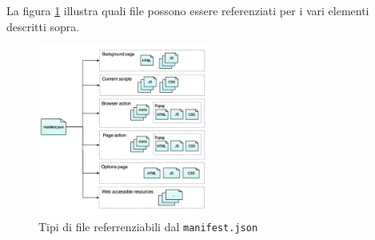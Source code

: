 \documentclass{sapthesis}
\newcommand{\code}[1]{\texttt{#1}}
\newcommand{\manifest}{\code{manifest.json}}
\begin{document}
        La figura \ref{fig:manifest-content} illustra quali file possono essere referenziati per i vari elementi descritti sopra.

        \begin{figure}[ht]
            \centering                                                  
            \includegraphics[width=0.5\textwidth]{webextension-manifest-content}
            \caption{Tipi di file referrenziabili dal \manifest }
            \label{fig:manifest-content}                             
        \end{figure}
\end{document}
